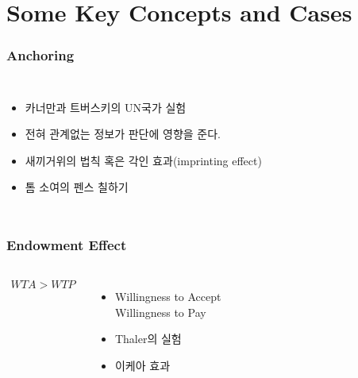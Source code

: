 \documentclass[final]{beamer}
\begin{document}
\section{Some Key Concepts and Cases}
%
\begin{frame}\frametitle{Anchoring}\vspace{3em}
%
\begin{columns}[c]
\column{18em}
\begin{itemize}
\item 카너만과 트버스키의 UN국가 실험 
\item 전혀 관계없는 정보가 판단에 영향을 준다.
\item 새끼거위의 법칙 혹은 각인 효과(imprinting effect)
\item 톰 소여의 펜스 칠하기 %
\end{itemize}
\column{12em}
\hspace{-1em}
\end{columns}
\end{frame}
%
\begin{frame}\frametitle{Endowment Effect}\vspace{3em}
%
\begin{columns}[c]
\column{12em}
\vspace{-2em}
\begin{align*}
WTA > WTP 
\end{align*}
\vspace{-1em}
%
\begin{itemize}
\item Willingness to Accept\\ Willingness to Pay 
\item Thaler의 실험
\item 이케아 효과 
\end{itemize}
\column{18em}
\hspace{-1em}
\end{columns}
\end{frame}
\end{document}
